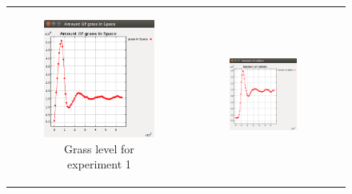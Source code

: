 \documentclass[11pt]{article}
\begin{document}
\begin{figure}
    \begin{tabular}{c c c}
         \begin{subfigure}[b]{0.3\textwidth}
        \includegraphics[width=\textwidth]{experiment/1/Grass.png}
        \caption{\label{img:grass1} Grass level for experiment 1}
    \end{subfigure} & 
    \begin{subfigure}[b]{0.3\textwidth}
        \includegraphics[width=\textwidth]{experiment/1/Rabbits.png}

\end{subfigure}
\end{tabular}
\end{figure}
\end{document}
